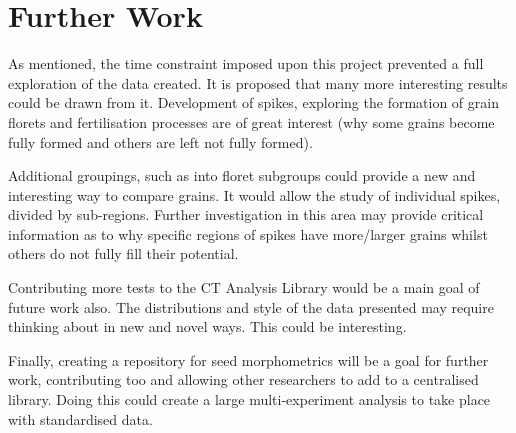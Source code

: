 \documentclass[11pt]{report}
\begin{document}
\section{Further Work}
\label{sec:orga1d8546}

As mentioned, the time constraint imposed upon this project prevented a full exploration of the data created. It is proposed that many more interesting results could be drawn from it. Development of spikes, exploring the formation of grain florets and fertilisation processes are of great interest (why some grains become fully formed and others are left not fully formed).

Additional groupings, such as into floret subgroups could provide a new and interesting way to compare grains. It would allow the study of individual spikes, divided by sub-regions. Further investigation in this area may provide critical information as to why specific regions of spikes have more/larger grains whilst others do not fully fill their potential.

Contributing more tests to the CT Analysis Library would be a main goal of future work also. The distributions and style of the data presented may require thinking about in new and novel ways. This could be interesting.

Finally, creating a repository for seed morphometrics will be a goal for further work, contributing too and allowing other researchers to add to a centralised library. Doing this could create a large multi-experiment analysis to take place with standardised data.


\appendix
\end{document}
